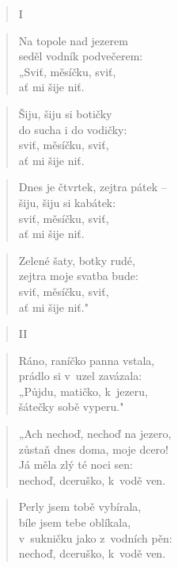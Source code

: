 \begin{verse}
I~\end{verse}

\begin{verse}
Na topole nad jezerem \\
seděl vodník podvečerem: \\
„Sviť, měsíčku, sviť, \\
ať mi šije niť.
\end{verse}

\begin{verse}
Šiju, šiju si botičky \\
do sucha i do vodičky: \\
sviť, měsíčku, sviť, \\
ať mi šije niť.
\end{verse}

\begin{verse}
Dnes je čtvrtek, zejtra pátek -- \\
šiju, šiju si kabátek: \\
sviť, měsíčku, sviť, \\
ať mi šije niť.
\end{verse}

\begin{verse}
Zelené šaty, botky rudé, \\
zejtra moje svatba bude: \\
sviť, měsíčku, sviť, \\
ať mi šije niť."
\end{verse}

\begin{verse}
II
\end{verse}

\begin{verse}
Ráno, raníčko panna vstala, \\
prádlo si v~uzel zavázala: \\
„Půjdu, matičko, k~jezeru, \\
šátečky sobě vyperu."
\end{verse}

\begin{verse}
„Ach nechoď, nechoď na jezero, \\
zůstaň dnes doma, moje dcero! \\
Já měla zlý té noci sen: \\
nechoď, dceruško, k~vodě ven.
\end{verse}

\begin{verse}
Perly jsem tobě vybírala, \\
bíle jsem tebe oblíkala, \\
v~sukničku jako z~vodních pěn: \\
nechoď, dceruško, k~vodě ven.
\end{verse}

